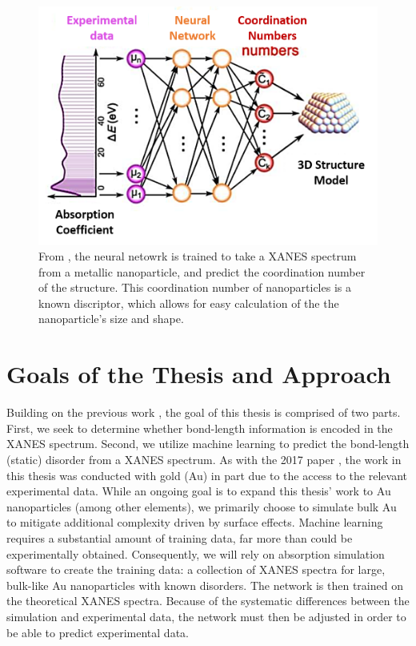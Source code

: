 \begin{figure}
    \centering
    \includegraphics[width=.75\linewidth]{Chapters/Figures/placeholderFrenkel2017.png}
    \caption[ANN Metallic Nanoparticles]{From \cite{Timoshenko2017}, the neural netowrk is trained to take a XANES spectrum from a metallic nanoparticle, and predict the coordination number of the structure. This coordination number of nanoparticles is a known discriptor, which allows for easy calculation of the the nanoparticle's size and shape.}
\end{figure}

\section{Goals of the Thesis and Approach}
Building on the previous work \cite{Timoshenko2017}, the goal of this thesis is comprised of two parts. First, we seek to determine whether bond-length information is encoded in the XANES spectrum. Second, we utilize machine learning to predict the bond-length (static) disorder from a XANES spectrum. As with the 2017 paper \cite{Timoshenko2017}, the work in this thesis was conducted with gold (Au) in part due to the access to the relevant experimental data. While an ongoing goal is to expand this thesis' work to Au nanoparticles (among other elements), we primarily choose to simulate bulk Au to mitigate additional complexity driven by surface effects. Machine learning requires a substantial amount of training data, far more than could be experimentally obtained. Consequently, we will rely on absorption simulation software to create the training data: a collection of XANES spectra for large, bulk-like Au nanoparticles with known disorders. The network is then trained on the theoretical XANES spectra. Because of the systematic differences between the simulation and experimental data, the network must then be adjusted in order to be able to predict experimental data.

